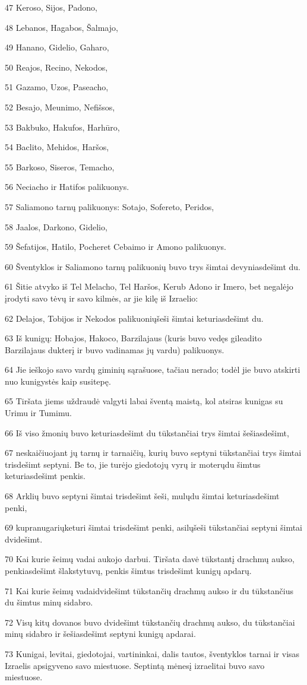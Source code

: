 \par 47 Keroso, Sijos, Padono, 
\par 48 Lebanos, Hagabos, Šalmajo, 
\par 49 Hanano, Gidelio, Gaharo, 
\par 50 Reajos, Recino, Nekodos, 
\par 51 Gazamo, Uzos, Paseacho, 
\par 52 Besajo, Meunimo, Nefišsos, 
\par 53 Bakbuko, Hakufos, Harhūro, 
\par 54 Baclito, Mehidos, Haršos, 
\par 55 Barkoso, Siseros, Temacho, 
\par 56 Neciacho ir Hatifos palikuonys. 
\par 57 Saliamono tarnų palikuonys: Sotajo, Sofereto, Peridos, 
\par 58 Jaalos, Darkono, Gidelio, 
\par 59 Šefatijos, Hatilo, Pocheret Cebaimo ir Amono palikuonys. 
\par 60 Šventyklos ir Saliamono tarnų palikuonių buvo trys šimtai devyniasdešimt du. 
\par 61 Šitie atvyko iš Tel Melacho, Tel Haršos, Kerub Adono ir Imero, bet negalėjo įrodyti savo tėvų ir savo kilmės, ar jie kilę iš Izraelio: 
\par 62 Delajos, Tobijos ir Nekodos palikuonių­šeši šimtai keturiasdešimt du. 
\par 63 Iš kunigų: Hobajos, Hakoco, Barzilajaus (kuris buvo vedęs gileadito Barzilajaus dukterį ir buvo vadinamas jų vardu) palikuonys. 
\par 64 Jie ieškojo savo vardų giminių sąrašuose, tačiau nerado; todėl jie buvo atskirti nuo kunigystės kaip susitepę. 
\par 65 Tiršata jiems uždraudė valgyti labai šventą maistą, kol atsiras kunigas su Urimu ir Tumimu. 
\par 66 Iš viso žmonių buvo keturiasdešimt du tūkstančiai trys šimtai šešiasdešimt, 
\par 67 neskaičiuojant jų tarnų ir tarnaičių, kurių buvo septyni tūkstančiai trys šimtai trisdešimt septyni. Be to, jie turėjo giedotojų vyrų ir moterų­du šimtus keturiasdešimt penkis. 
\par 68 Arklių buvo septyni šimtai trisdešimt šeši, mulų­du šimtai keturiasdešimt penki, 
\par 69 kupranugarių­keturi šimtai trisdešimt penki, asilų­šeši tūkstančiai septyni šimtai dvidešimt. 
\par 70 Kai kurie šeimų vadai aukojo darbui. Tiršata davė tūkstantį drachmų aukso, penkiasdešimt šlakstytuvų, penkis šimtus trisdešimt kunigų apdarų. 
\par 71 Kai kurie šeimų vadai­dvidešimt tūkstančių drachmų aukso ir du tūkstančius du šimtus minų sidabro. 
\par 72 Visų kitų dovanos buvo dvidešimt tūkstančių drachmų aukso, du tūkstančiai minų sidabro ir šešiasdešimt septyni kunigų apdarai. 
\par 73 Kunigai, levitai, giedotojai, vartininkai, dalis tautos, šventyklos tarnai ir visas Izraelis apsigyveno savo miestuose. Septintą mėnesį izraelitai buvo savo miestuose.



